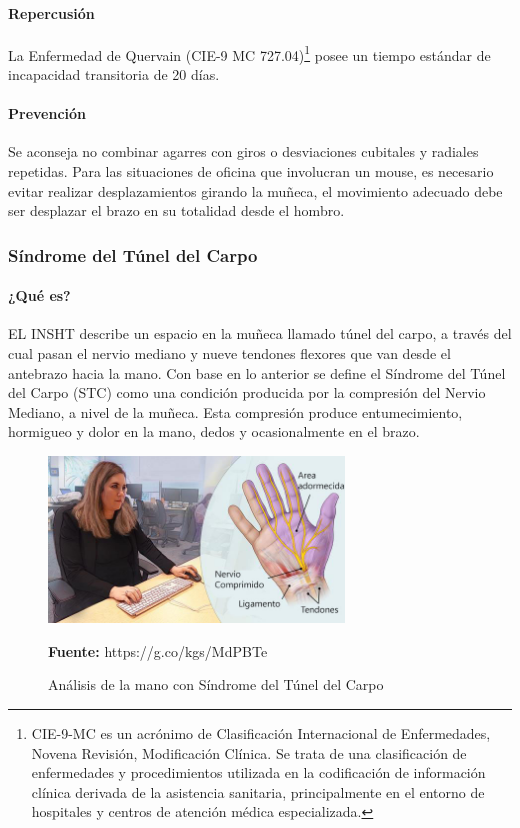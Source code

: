 \paragraph{Repercusión}
La Enfermedad de Quervain (CIE-9 MC 727.04)\footnote{CIE-9-MC es un acrónimo de Clasificación Internacional de Enfermedades, Novena Revisión, Modificación Clínica. Se trata de una clasificación de enfermedades y procedimientos utilizada en la codificación de información clínica derivada de la asistencia sanitaria, principalmente en el entorno de hospitales y centros de atención médica especializada.} posee un tiempo estándar de incapacidad transitoria de 20 días.\parencite[6]{INSHT2017TendinitisPulgar}
\paragraph{Prevención}
Se aconseja no combinar agarres con giros o desviaciones cubitales y radiales repetidas. Para las situaciones de oficina que involucran un mouse, es necesario evitar realizar desplazamientos girando la muñeca, el movimiento adecuado debe ser desplazar el brazo en su totalidad desde el hombro. \parencite[5]{INSHT2017TendinitisPulgar}
\subsubsection{Síndrome del Túnel del Carpo}
\paragraph{¿Qué es?}
EL INSHT describe un espacio en la muñeca llamado túnel del carpo, a través del cual pasan el nervio mediano y nueve tendones flexores que van desde el antebrazo hacia la mano\parencite[1]{INSHT2017SindromeCarpiano}. Con base en lo anterior se define el Síndrome del Túnel del Carpo (STC) como una condición producida por la compresión del Nervio Mediano, a nivel de la muñeca. Esta compresión produce entumecimiento, hormigueo y dolor en la mano, dedos y ocasionalmente en el brazo. \parencite[1]{INSHT2017SindromeCarpiano}

\begin{figure}[H]
    \centering
    \includegraphics[width=0.7\textwidth]{Anexos/LATEX/chapters/images/STC.jpg}
    \caption{Análisis de la mano con Síndrome del Túnel del Carpo}
    \small{\textbf{Fuente:} https://g.co/kgs/MdPBTe}
    \label{STC}
\end{figure}

